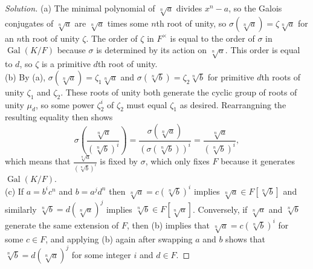 \documentclass[10pt]{article}
\providecommand{\Gal}{\operatorname{Gal}}
\newenvironment{soln}{\begin{proof}[Solution]}{\end{proof}}
\begin{document}
\begin{soln}
    (a) The minimal polynomial of $\sqrt[n]a$ divides $x^n - a$,
    so the Galois conjugates of $\sqrt[n]a$
    are $\sqrt[n]a$ times some $n$th root of unity,
    so $\sigma(\sqrt[n]a) = \zeta\sqrt[n]a$
    for an $n$th root of unity $\zeta$.
    The order of $\zeta$ in $F^\times$
    is equal to the order of $\sigma$ in $\Gal(K/F)$
    because $\sigma$ is determined by its action on $\sqrt[n]a$.
    This order is equal to $d$,
    so $\zeta$ is a primitive $d$th root of unity.
    \\

    (b) By (a), $\sigma(\sqrt[n]a) = \zeta_1\sqrt[n]a$
    and $\sigma(\sqrt[n]b) = \zeta_2\sqrt[n]b$
    for primitive $d$th roots of unity $\zeta_1$ and $\zeta_2$.
    These roots of unity both generate the cyclic group
    of roots of unity $\mu_d$, so some power $\zeta_2^i$ of $\zeta_2$
    must equal $\zeta_1$ as desired.
    Rearrangning the resulting equality then shows
    \begin{equation*}
	\sigma\left(\frac{\sqrt[n]a}{(\sqrt[n]b)^i}\right)
	= \frac{\sigma(\sqrt[n]a)}{(\sigma(\sqrt[n]b))^i}
	= \frac{\sqrt[n]a}{(\sqrt[n]b)^i},
    \end{equation*}
    which means that $\frac{\sqrt[n]a}{(\sqrt[n]b)^i}$
    is fixed by $\sigma$, which only fixes $F$
    because it generates $\Gal(K/F)$.
    \\

    (c) If $a = b^i c^n$ and $b = a^j d^n$
    then $\sqrt[n]a = c(\sqrt[n]b)^i$ implies
    $\sqrt[n]a\in F[\sqrt[n]b]$
    and similarly $\sqrt[n]b = d(\sqrt[n]a)^j$ implies
    $\sqrt[n]b\in F[\sqrt[n]a]$.
    Conversely, if $\sqrt[n]a$ and $\sqrt[n]b$ generate
    the same extension of $F$, then (b) implies that
    $\sqrt[n]a = c(\sqrt[n]b)^i$ for some $c\in F$,
    and applying (b) again after swapping $a$ and $b$
    shows that $\sqrt[n]b = d(\sqrt[n]a)^j$ for some integer $i$
    and $d\in F$.
\end{soln}
\end{document}
